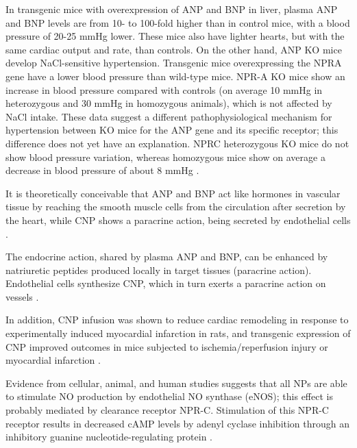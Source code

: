 \documentclass[14pt,a4paper,onecolumn]{extarticle}
\begin{document}
In transgenic mice with overexpression of ANP and BNP in liver, plasma ANP and BNP levels are from 10- to 100-fold higher than in control mice, with a blood pressure of 20-25 mmHg lower. These mice also have lighter hearts, but with the same cardiac output and rate, than controls.  On the other hand, ANP KO mice develop NaCl-sensitive hypertension. Transgenic mice overexpressing the NPRA gene have  a lower blood pressure than wild-type mice. NPR-A KO mice show an increase in blood pressure compared with controls (on average 10 mmHg in heterozygous and 30 mmHg in homozygous animals), which is not affected by NaCl intake. These data suggest a different pathophysiological mechanism for hypertension between KO mice for the ANP gene and its specific receptor; this difference does not yet have an explanation. NPRC heterozygous KO mice do not show blood pressure variation, whereas homozygous mice show on average a decrease in blood pressure of about 8 mmHg \citep{251}.


It is theoretically conceivable that ANP and BNP act like hormones in vascular tissue by reaching the smooth muscle cells from the circulation after secretion by the heart, while CNP shows a paracrine action, being secreted by endothelial cells \citep{57} \citep{87} \citep{88}. %

The endocrine action, shared by plasma ANP and BNP, can be enhanced by natriuretic peptides produced locally in target tissues (paracrine action). Endothelial cells synthesize CNP, which in turn exerts a paracrine action on vessels \citep{88}.

In addition, CNP infusion was shown to reduce cardiac remodeling in response to experimentally induced myocardial infarction in rats, and transgenic expression of CNP improved outcomes in mice subjected to ischemia/reperfusion injury or myocardial infarction \citep{Wang2007}. %

Evidence from cellular, animal, and human studies suggests that all NPs are able to stimulate NO production by endothelial NO synthase (eNOS); this effect is probably mediated by clearance receptor NPR-C. Stimulation of this NPR-C receptor results in decreased cAMP levels by adenyl cyclase inhibition through an inhibitory guanine nucleotide-regulating protein \citep{270}.
\end{document}
